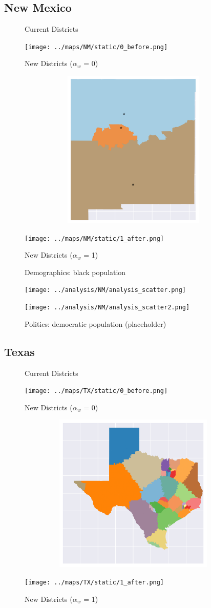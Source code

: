 \subsection{New Mexico}
\begin{figure}[htb!] \centering
\caption{ Current Districts }
\texttt{[image: ../maps/NM/static/0\_before.png]}
\caption{ New Districts ($\alpha_w$ = 0) }
\includegraphics[width=5in,height=3in,keepaspectratio]{../maps/NM/static/0_after.png}
\caption{ New Districts ($\alpha_w$ = 1) }
\texttt{[image: ../maps/NM/static/1\_after.png]}
\end{figure}

\clearpage
\newpage

\begin{figure}[htb!] \centering
\caption{ Demographics: black population }
\texttt{[image: ../analysis/NM/analysis\_scatter.png]}
\caption{ Politics: democratic population (placeholder)}
\texttt{[image: ../analysis/NM/analysis\_scatter2.png]}
\end{figure}

\clearpage
\newpage

\subsection{Texas}
\begin{figure}[htb!] \centering
\caption{ Current Districts }
\texttt{[image: ../maps/TX/static/0\_before.png]}
\caption{ New Districts ($\alpha_w$ = 0) }
\includegraphics[width=5in,height=3in,keepaspectratio]{../maps/TX/static/0_after.png}
\caption{ New Districts ($\alpha_w$ = 1) }
\texttt{[image: ../maps/TX/static/1\_after.png]}
\end{figure}

